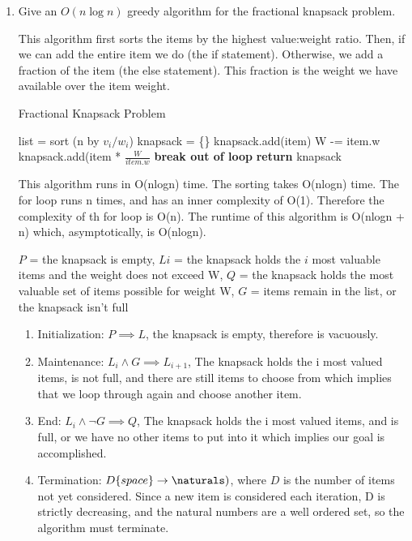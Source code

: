 \documentclass{article}
\begin{document}
\begin{enumerate}
    \item Give an $O(n\log n)$ greedy algorithm for the fractional knapsack problem.
      
This algorithm first sorts the items by the highest value:weight ratio. Then, if we can add the entire item we do (the if statement). Otherwise, we add a fraction of the item (the else statement). This fraction is the weight we have available over the item weight. 

\begin{algorithm}
    \caption{Fractional Knapsack Problem}\label{fracKnap}
    \begin{algorithmic}[1]
      \State list = sort (n by $v_i/w_i$)
      \State knapsack = \{\}
      		\State knapsack.add(item)
      		\State W -= item.w
      	\Else
      		\State knapsack.add(item * $\frac{W}{item.w}$
      		\State \textbf{break out of loop}
      	\EndIf
      \EndFor
      \State \textbf{return} knapsack
    \EndFunction
    \end{algorithmic}
\end{algorithm} 

This algorithm runs in O(nlogn) time. The sorting takes O(nlogn) time. The for loop runs n times, and has an inner complexity of O(1). Therefore the complexity of th for loop is O(n). The runtime of this algorithm is O(nlogn + n) which, asymptotically, is O(nlogn).

$P$ = the knapsack is empty, $Li$ = the knapsack holds the $i$ most valuable items and the weight does not exceed W, $Q$ = the knapsack holds the most valuable set of items possible for weight W, $G$ = items remain in the list, or the knapsack isn't full
    \begin{enumerate}
        \item Initialization: $P \implies L$, the knapsack is empty, therefore is vacuously.
        \item Maintenance: $L_{i} \land G \implies L_{i+1}$, The knapsack holds the i most valued items, is not full, and there are still items to choose from which implies that we loop through again and choose another item.
        \item End: $L_{i} \land \neg G \implies Q$, The knapsack holds the i most valued items, and is full, or we have no other items to put into it which implies our goal is accomplished.
        \item Termination: $D\{space\} \rightarrow \naturals)$, where $D$ is the number of items not yet considered. Since a new item is considered each iteration, D is strictly decreasing, and the natural numbers are a well ordered set, so the algorithm must terminate.
    \end{enumerate}
    

\end{enumerate}
\end{document}
